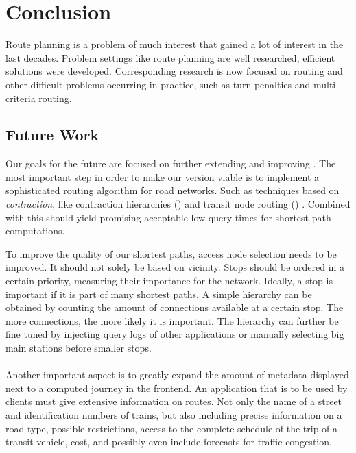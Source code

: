 \chapter{Conclusion}\label{conclusion}
	Route planning is a problem of much interest that gained a lot of interest in the last decades. Problem settings like \uniModal route planning are
	well researched, efficient solutions were developed. Corresponding research is now focused on \multiModal routing and other difficult problems
	occurring in practice, such as turn penalties and multi criteria routing.

\section{Future Work}
	Our goals for the future are focused on further extending and improving \cobweb. The most important step in order to make our \anr version
	viable is to implement a sophisticated routing algorithm for road networks. Such as techniques based on \textit{contraction}, like contraction
	hierarchies (\ch)  and transit node routing (\tnr) . Combined with \csa this should yield promising
	acceptable low query times for shortest path computations.
	
	To improve the quality of our shortest paths, access node selection needs to be improved. It should not solely be based on vicinity.
	Stops should be ordered in a certain priority, measuring their importance for the network. Ideally, a stop is important if it is part
	of many shortest paths. A simple hierarchy can be obtained by counting the amount of connections available at a certain stop.
	The more connections, the more likely it is important.
	The hierarchy can further be fine tuned by injecting query logs of other applications or manually selecting big main
	stations before smaller stops.\\\\
	Another important aspect is to greatly expand the amount of metadata displayed next to a computed journey in the frontend.
	An application that is to be used by clients must give extensive information on routes. Not only the name of a street and identification numbers of
	trains, but also including precise information on a road type, possible restrictions, access to the complete schedule of the trip of a transit vehicle,
	cost, and possibly even include forecasts for traffic congestion.
	
